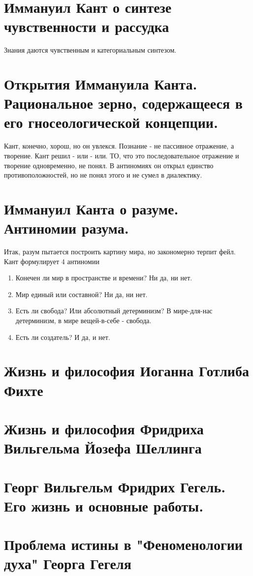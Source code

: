\section{Иммануил Кант о синтезе чувственности и рассудка}
Знания даются чувственным и категориальным синтезом.

\section{Открытия Иммануила Канта. Рациональное зерно, содержащееся в его гносеологической концепции.}
Кант, конечно, хорош, но он увлекся. Познание - не пассивное отражение, а творение. Кант решил - или - или. ТО, что это последовательное отражение и творение одновременно, не понял.  В антиномиях он открыл единство противоположностей, но не понял этого и не сумел в диалектику.

\section{Иммануил Канта о разуме. Антиномии разума.}
Итак, разум пытается построить картину мира, но закономерно терпит фейл. Кант формулирует 4 антиномии
\begin{enumerate}
\item Конечен ли мир в пространстве и времени? Ни да, ни нет.
\item Мир единый или составной? Ни да, ни нет.
\item Есть ли свобода? Или абсолютный детерминизм? В мире-для-нас детерминизм, в мире вещей-в-себе - свобода. 
\item Есть ли создатель? И да, и нет.
\end{enumerate}

\section{Жизнь и философия Иоганна Готлиба Фихте}
\section{Жизнь и философия Фридриха Вильгельма Йозефа Шеллинга}

\section{Георг Вильгельм Фридрих Гегель. Его жизнь и основные работы.}
\section{Проблема истины в "Феноменологии духа" Георга Гегеля}
